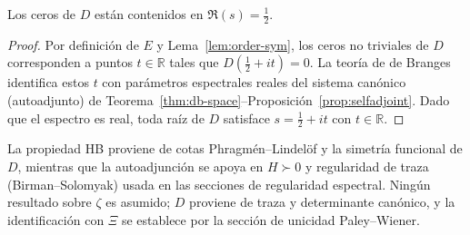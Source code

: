 \begin{theorem}
\label{thm:critical-line}
Los ceros de $D$ están contenidos en $\Re(s)=\tfrac12$.
\end{theorem}

\begin{proof}
Por definición de $E$ y Lema~\ref{lem:order-sym}, los ceros no triviales de $D$
corresponden a puntos $t\in\mathbb{R}$ tales que $D(\tfrac12+it)=0$.
La teoría de de Branges identifica estos $t$ con parámetros espectrales reales del
sistema canónico (autoadjunto) de Teorema~\ref{thm:db-space}--Proposición~\ref{prop:selfadjoint}.
Dado que el espectro es real, toda raíz de $D$ satisface
$s=\tfrac12+it$ con $t\in\mathbb{R}$. 
\end{proof}

\begin{remark}
La propiedad HB proviene de cotas Phragm\'en–Lindel\"of y la simetría funcional de $D$,
mientras que la autoadjunción se apoya en $H\succ 0$ y regularidad de traza (Birman–Solomyak)
usada en las secciones de regularidad espectral. Ningún resultado sobre $\zeta$ es
asumido; $D$ proviene de traza y determinante canónico, y la identificación con $\Xi$
se establece por la sección de unicidad Paley–Wiener.
\end{remark}
